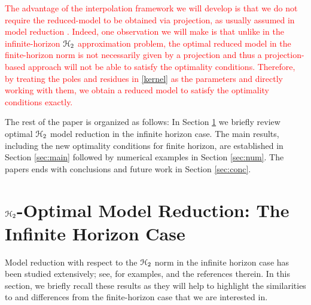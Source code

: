 \documentclass[twocolumn]{autart}
\begin{document}
\textcolor{red}{The advantage of the interpolation framework we will develop  is that 
we do not require the reduced-model to be obtained via projection, as usually assumed in model reduction \cite{Ant05}. Indeed, one observation we will make is that unlike in the infinite-horizon $\EuScript{H}_2$ approximation problem, the optimal reduced model in the finite-horizon norm is not necessarily given by a projection and thus a projection-based approach will not be able to satisfy the optimality conditions. Therefore,  
by treating the poles and residues in \eqref{kernel} as the parameters and directly working with them, we  obtain a reduced model to satisfy the optimality conditions exactly.}


The rest of the paper is organized as follows: In Section  \ref{sec:intro} we briefly review optimal  $\EuScript{H}_2$ model reduction in the infinite horizon case. The main results, including the new optimality conditions for finite horizon, are established in Section \ref{sec:main} followed by numerical examples in Section \ref{sec:num}. The papers ends with conclusions and future work in Section \ref{sec:conc}.

\section{$\EuScript{H}_2$-Optimal Model Reduction: The Infinite Horizon Case} \label{sec:intro}
Model reduction with respect to the $\EuScript{H}_2$ norm in the infinite horizon case has been studied extensively; see, for examples, \cite{BarCO91,BryC90,FulO90,MeiL67,Hal92,HylB85,SpaMM92,YanL99,LepMPV91,GugBA08,AniBGA13,Wil70,vuillemin2014poles,CasL18,panzer2013,gerstner2007hom,VanGA08,breiten2013near} and the references therein. 
In this section, we briefly recall these results as they will help to highlight the similarities to and differences from the finite-horizon case that we are interested in.
\end{document}
